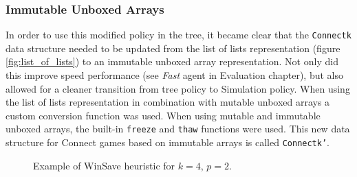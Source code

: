\subsubsection{Immutable Unboxed Arrays}
In order to use this modified policy in the tree, it became clear that the \texttt{Connectk} data structure needed to be updated from the {list of lists} representation (figure \ref{fig:list_of_lists}) to an immutable unboxed array representation. Not only did this improve speed performance (see \textit{Fast} agent in Evaluation chapter), but also allowed for a cleaner transition from tree policy to Simulation policy. When using the {list of lists} representation in combination with mutable unboxed arrays a custom conversion function was used. When using mutable and immutable unboxed arrays, the built-in \texttt{freeze} and \texttt{thaw} functions were used. This new data structure for {Connect} games based on immutable arrays is called \texttt{Connectk'}.
\begin{figure}[]
\centering
{}\linebreak
{}\linebreak
{}
\linebreak
{}\linebreak
{}
\caption{Example of {WinSave} heuristic for $k=4$, $p=2$.\label{fig:winsave}}
\end{figure}

